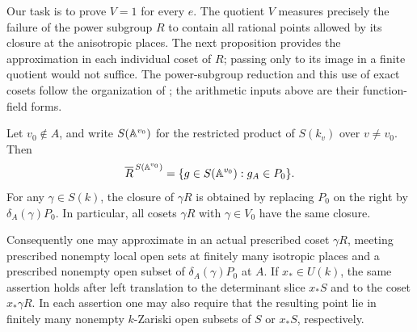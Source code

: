Our task is to prove $V=1$ for every $e$.  The quotient $V$ measures
precisely the failure of the power subgroup $R$ to contain all rational
points allowed by its closure at the anisotropic places.  The next
proposition provides the approximation in each individual coset of $R$;
passing only to its image in a finite quotient would not suffice.
The power-subgroup reduction and this use of exact cosets follow the
organization of \cite[Section~2.2]{MPNF}; the arithmetic inputs above
are their function-field forms.

\begin{proposition}\label{arith:closure}
Let $v_0\notin A$, and write $S(\mathbb A^{v_0})$ for the restricted product
of $S(k_v)$ over $v\ne v_0$.  Then
\begin{equation}\label{arith:adelic-closure}
 \overline{R}^{\,S(\mathbb A^{v_0})}
 =\{g\in S(\mathbb A^{v_0}):g_A\in P_0\}.
\end{equation}
For any $\gamma\in S(k)$, the closure of $\gamma R$ is obtained by
replacing $P_0$ on the right by $\delta_A(\gamma)P_0$.  In particular,
all cosets $\gamma R$ with $\gamma\in V_0$ have the same closure.

Consequently one may approximate in an actual prescribed coset
$\gamma R$, meeting prescribed nonempty local open sets at finitely many
isotropic places and a prescribed nonempty open subset of
$\delta_A(\gamma)P_0$ at $A$.
If $x_*\in U(k)$, the same assertion holds after left translation to
the determinant slice $x_*S$ and to the coset $x_*\gamma R$.
In each assertion one may also require that the resulting point lie in
finitely many nonempty $k$-Zariski open subsets of $S$ or $x_*S$,
respectively.
\end{proposition}

